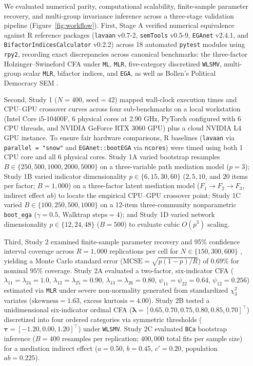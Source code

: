 ﻿\documentclass[12pt,letterpaper]{article}
\begin{document}
We evaluated numerical parity, computational scalability, finite-sample parameter recovery, and multi-group invariance inference across a three-stage validation pipeline (Figure~\ref{fig:workflow}). First, Stage A verified numerical equivalence against R reference packages (\texttt{lavaan} v0.7-2, \texttt{semTools} v0.5-9, \texttt{EGAnet} v2.4.1, and \texttt{BifactorIndicesCalculator} v0.2.2) across 18 automated \texttt{pytest} modules using \texttt{rpy2}, recording exact discrepancies across canonical benchmarks: the three-factor Holzinger--Swineford CFA \parencite[$N = 301$, $p = 9$;][]{holzinger1939} under \texttt{ML}, \texttt{MLR}, five-category discretized \texttt{WLSMV}, multi-group scalar \texttt{MLR}, bifactor indices, and \texttt{EGA}, as well as Bollen's Political Democracy SEM \parencite[$N = 75$, $p = 11$;][]{bollen1989}.

Second, Study 1 ($N = 400$, $\text{seed} = 42$) mapped wall-clock execution times and CPU--GPU crossover curves across four sub-benchmarks on a local workstation (Intel Core i5-10400F, 6 physical cores at 2.90 GHz, PyTorch configured with 6 CPU threads, and NVIDIA GeForce RTX 3060 GPU) plus a cloud NVIDIA L4 GPU instance. To ensure fair hardware comparisons, R baselines (\texttt{lavaan} via \texttt{parallel = "snow"} and \texttt{EGAnet::bootEGA} via \texttt{ncores}) were timed using both 1 CPU core and all 6 physical cores. Study 1A varied bootstrap resamples $B \in \{250, 500, 1000, 2000, 5000\}$ on a three-variable path mediation model ($p = 3$); Study 1B varied indicator dimensionality $p \in \{6, 15, 30, 60\}$ ($2, 5, 10$, and $20$ items per factor; $B = 1{,}000$) on a three-factor latent mediation model ($F_1 \to F_2 \to F_3$, indirect effect $ab$) to locate the empirical CPU--GPU crossover point; Study 1C varied $B \in \{100, 250, 500, 1000\}$ on a 12-item three-community nonparametric \texttt{boot\_ega} ($\gamma = 0.5$, Walktrap $\text{steps} = 4$); and Study 1D varied network dimensionality $p \in \{12, 24, 48\}$ ($B = 500$) to evaluate cubic $O(p^3)$ scaling.

Third, Study 2 examined finite-sample parameter recovery and 95\% confidence interval coverage across $R = 1{,}000$ replications per cell for $N \in \{150, 300, 600\}$ \parencite{hoogland1998, muthen2002}, yielding a Monte Carlo standard error ($\mathrm{MCSE} = \sqrt{p(1-p)/R}$) of $0.69\%$ for nominal $95\%$ coverage. Study 2A evaluated a two-factor, six-indicator CFA ($\lambda_{11} = \lambda_{24} = 1.0$, $\lambda_{12} = \lambda_{25} = 0.90$, $\lambda_{13} = \lambda_{26} = 0.80$, $\psi_{11} = \psi_{22} = 0.64$, $\psi_{12} = 0.256$) estimated via \texttt{MLR} under severe non-normality generated from standardized $\chi^2_3$ variates ($\text{skewness} = 1.63$, excess $\text{kurtosis} = 4.00$). Study 2B tested a unidimensional six-indicator ordinal CFA ($\boldsymbol{\lambda} = [0.65, 0.70, 0.75, 0.80, 0.85, 0.70]^{\top}$) discretized into four ordered categories via symmetric thresholds ($\boldsymbol{\tau} = [-1.20, 0.00, 1.20]^{\top}$) under \texttt{WLSMV}. Study 2C evaluated \texttt{BCa} bootstrap inference ($B = 400$ resamples per replication; $400{,}000$ total fits per sample size) for a mediation indirect effect ($a = 0.50$, $b = 0.45$, $c' = 0.20$, population $ab = 0.225$).
\end{document}
